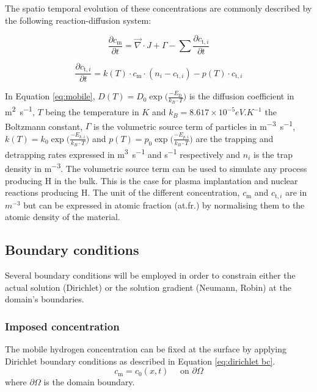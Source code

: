 The spatio temporal evolution of these concentrations are commonly described by the following reaction-diffusion system:

\begin{equation}
    \frac{\partial c_\mathrm{m}}{\partial t}=\vec{\nabla} \cdot J+\Gamma-\sum \frac{\partial c_{\mathrm{t}, i}}{\partial t}
    \label{eq:mobile}
\end{equation}

\begin{equation}
    \frac{\partial c_{\mathrm{t}, i}}{\partial t}=k(T) \cdot c_\mathrm{m} \cdot\left(n_{i}-c_{\mathrm{t}, i}\right)-p(T) \cdot c_{\mathrm{t}, i}
    \label{eq:trapped}
\end{equation}

In Equation \ref{eq:mobile}, ${D(T)=D_0 \exp\big(\frac{-E_\mathrm{D}}{k_B \cdot T}\big)}$ is the diffusion coefficient in \si{m^2.s^{-1}}, $T$ being the temperature in $\si{K}$ and ${k_B = 8.617 \times 10^{-5} \si{eV.K^{-1}}}$ the Boltzmann constant, $\Gamma$ is the volumetric source term of particles in \si{m^{-3}.s^{-1}}, $k(T)=k_0\exp{\big(\frac{-E_{k, i}}{k_B \cdot T}\big)}$ and $p(T)=p_0\exp{\big(\frac{-E_{p, i}}{k_B \cdot T}\big)}$ are the trapping and detrapping rates expressed in \si{m^3.s^{-1}} and \si{s^{-1}} respectively and $n_i$ is the trap density in \si{m^{-3}}.
The volumetric source term can be used to simulate any process producing H in the bulk.
This is the case for plasma implantation and nuclear reactions producing H.
The unit of the different concentration, $c_\mathrm{m}$ and $c_{\mathrm{t},i}$ are in $ \si{m^{-3}}$ but can be expressed in atomic fraction (at.fr.) by normalising them to the atomic density of the material.

\subsection{Boundary conditions}

Several boundary conditions will be employed in order to constrain either the actual solution (Dirichlet) or the solution gradient (Neumann, Robin) at the domain's boundaries.

\subsubsection{Imposed concentration}

The mobile hydrogen concentration can be fixed at the surface by applying Dirichlet boundary conditions as described in Equation \ref{eq:dirichlet bc}.
\begin{equation}
    c_\mathrm{m} = c_0(x, t) \quad \text { on } \partial \Omega
    \label{eq:dirichlet bc}
\end{equation}
where $\partial \Omega$ is the domain boundary.

